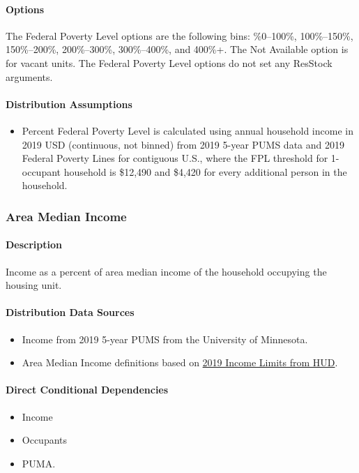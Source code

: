 \paragraph{Options}
The Federal Poverty Level options are the following bins: \%0--100\%, 100\%--150\%, 150\%--200\%, 200\%--300\%, 300\%--400\%, and 400\%+. The Not Available option is for vacant units. The Federal Poverty Level options do not set any ResStock arguments.

\paragraph{Distribution Assumptions}
\begin{itemize}
\item
  Percent Federal Poverty Level is calculated using annual household income
  in 2019 USD (continuous, not binned) from 2019 5-year PUMS data and 2019
  Federal Poverty Lines for contiguous U.S., where the FPL threshold for
  1-occupant household is \$12,490 and \$4,420 for every additional person
  in the household.
\end{itemize}

\subsubsection{Area Median Income}\label{area_median_income}
\paragraph{Description}
Income as a percent of area median income of the household occupying the housing unit.

\paragraph{Distribution Data Sources}
\begin{itemize}
\item 
  Income from 2019 5-year PUMS from the University of Minnesota.
\item 
  Area Median Income definitions based on \href{https://www.huduser.gov/portal/datasets/il.html#data_2019}{2019 Income Limits from HUD}.
  
\end{itemize}

\paragraph{Direct Conditional Dependencies}
\begin{itemize}
    \item Income
    \item Occupants
    \item PUMA.
\end{itemize}

